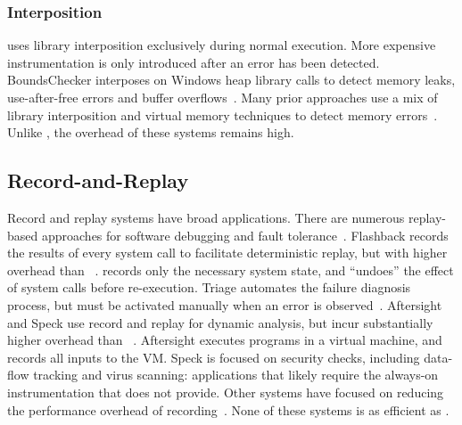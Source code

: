 \subsubsection*{Interposition}
\doubletake{} uses library interposition exclusively during normal execution. More expensive instrumentation is only introduced after an error has been detected. BoundsChecker interposes on Windows heap library calls to detect memory leaks, use-after-free errors and buffer overflows~\cite{BoundsChecker}. Many prior approaches use a mix of library interposition and virtual memory techniques to detect memory errors~\cite{duma, Sleigh, Undangle, SWAT, Dlmalloc, GuardMalloc, exterminator, Hound, electricfence, overflow:Cruiser}. Unlike \doubletake{}, the overhead of these systems remains high.
 
\subsection{Record-and-Replay}
Record and replay systems have broad applications. There are numerous replay-based approaches for software debugging and fault tolerance~\cite{Bressoud:1995:HFT:224056.224058, OSDebug, Rx, RecPlay, Flashback, Triage}. Flashback records the results of every system call to facilitate deterministic replay, but with higher overhead than \doubletake{}~\cite{Flashback}. \doubletake{} records only the necessary system state, and ``undoes'' the effect of system calls before re-execution. Triage automates the failure diagnosis process, but must be activated manually when an error is observed~\cite{Triage}. Aftersight and Speck use record and replay for dynamic analysis, but incur substantially higher overhead than \doubletake{}~\cite{Aftersight, Speck}. Aftersight executes programs in a virtual machine, and records all inputs to the VM. Speck is focused on security checks, including data-flow tracking and virus scanning: applications that likely require the always-on instrumentation that \doubletake{} does not provide. Other systems have focused on reducing the performance overhead of recording~\cite{ODR, Respec, PRES, DoublePlay}. None of these systems is as efficient as \doubletake{}.
